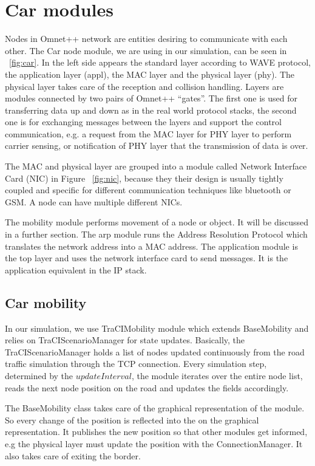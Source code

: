 \section{Car modules}
Nodes in Omnet++ network are entities desiring to communicate with each other.
The Car node module, we are using in our simulation, can be seen in
~\ref{fig:car}. In the left side appears the standard layer according to WAVE
protocol, the application layer (appl), the MAC layer and the physical
layer (phy). The physical layer takes care of the reception and collision
handling. Layers are modules connected by two pairs of Omnet++ ``gates''. The
first one is used for transferring data up and down as in the real world
protocol stacks, the second one is for exchanging messages between the layers
and support the control communication, e.g. a request from the MAC layer for PHY
layer to perform carrier sensing, or notification of PHY layer that the
transmission of data is over.

The MAC and physical layer are grouped into a module called Network Interface
Card (NIC) in Figure ~\ref{fig:nic}, because they their design is usually
tightly coupled and specific for different communication techniques like
bluetooth or GSM. A node can have multiple different NICs.

The mobility module performs movement of a node or object. It will be discussed
in a further section. The arp module runs the Address Resolution Protocol which
translates the network address into a MAC address. The application module is the
top layer and uses the network interface card to send messages. It is the
application equivalent in the IP stack.

\subsection{Car mobility}

In our simulation, we use TraCIMobility module which extends BaseMobility and
relies on TraCIScenarioManager for state updates. Basically, the
TraCIScenarioManager holds a list of nodes updated continuously from the road
traffic simulation through the TCP connection. Every simulation step, determined
by the $updateInterval$, the module iterates over the entire node list, reads
the next node position on the road and updates the fields accordingly.

The BaseMobility class takes care of the graphical representation of the module.
So every change of the position is reflected into the on the graphical
representation. It publishes the new position so that other modules get
informed, e.g the physical layer must update the position with the
ConnectionManager. It also takes care of exiting the border.

